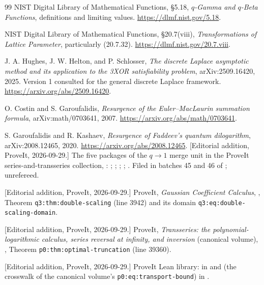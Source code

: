 \documentclass[11pt,a4paper]{article}
\numberwithin{equation}{section}
\theoremstyle{definition}\newtheorem{definition}[theorem]{Definition}
\theoremstyle{remark}\newtheorem{remark}[theorem]{Remark}
\begin{document}
\begin{thebibliography}{99}
NIST Digital Library of Mathematical Functions, \S5.18,
\emph{$q$-Gamma and $q$-Beta Functions}, definitions and limiting values.
\url{https://dlmf.nist.gov/5.18}.

NIST Digital Library of Mathematical Functions, \S20.7(viii),
\emph{Transformations of Lattice Parameter}, particularly (20.7.32).
\url{https://dlmf.nist.gov/20.7.viii}.

J. A. Hughes, J. W. Helton, and P. Schlosser,
\emph{The discrete Laplace asymptotic method and its application to the
3XOR satisfiability problem}, arXiv:2509.16420, 2025.
Version 1 consulted for the general discrete Laplace framework.
\url{https://arxiv.org/abs/2509.16420}.

O. Costin and S. Garoufalidis,
\emph{Resurgence of the Euler--MacLaurin summation formula},
arXiv:math/0703641, 2007.
\url{https://arxiv.org/abs/math/0703641}.

S. Garoufalidis and R. Kashaev,
\emph{Resurgence of Faddeev's quantum dilogarithm},
arXiv:2008.12465, 2020.
\url{https://arxiv.org/abs/2008.12465}.
[Editorial addition, ProveIt, 2026-09-29.] The five packages of the
$q\to1$ merge unit in the ProveIt series-and-transseries collection,
:
;
;
;
;
.
Filed in batches 45 and 46 of ; unrefereed.

[Editorial addition, ProveIt, 2026-09-29.] ProveIt, \emph{Gaussian
Coefficient Calculus},
,
Theorem \texttt{q3:thm:double-scaling} (line 3942) and its domain
\texttt{q3:eq:double-scaling-domain}.

[Editorial addition, ProveIt, 2026-09-29.] ProveIt, \emph{Transseries: the
polynomial-logarithmic calculus, series reversal at infinity, and
inversion} (canonical volume),
,
Theorem \texttt{p0:thm:optimal-truncation} (line 39360).

[Editorial addition, ProveIt, 2026-09-29.] ProveIt Lean library:
 in
and  (the crosswalk of the canonical volume's
\texttt{p0:eq:transport-bound}) in
.
\end{thebibliography}
\end{document}
